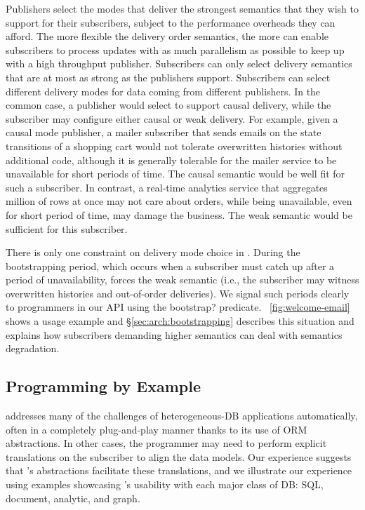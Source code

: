 Publishers select the modes that deliver the strongest semantics that
they wish to support for their subscribers, subject to the performance
overheads they can afford.  The more flexible the delivery order
semantics, the more \synapse can enable subscribers to process updates
with as much parallelism as possible to keep up with a high throughput
publisher.  Subscribers can only select delivery
semantics that are at most as strong as the publishers support.
Subscribers can select different delivery modes for data coming
from different publishers.  In the common case,
a publisher would select to support causal delivery, while the
subscriber may configure either causal or weak delivery. For example,
given a causal mode publisher, a mailer subscriber that sends emails
on the state transitions of a shopping cart would not tolerate
overwritten histories without additional code, although it is
generally tolerable for the mailer service to be unavailable for short
periods of time. The causal semantic would be well fit for
such a subscriber.  In contrast, a real-time analytics service that
aggregates million of rows at once may not care about orders, while
being unavailable, even for short period of time, may damage the
business.  The weak semantic would be sufficient for this subscriber.

There is only one constraint on delivery mode choice in
\synapse.  During the bootstrapping period, which occurs when a
subscriber must catch up after a period of unavailability, \synapse
forces the weak semantic (i.e., the subscriber may witness overwritten
histories and out-of-order deliveries).  We signal such periods
clearly to programmers in our API using the {\code bootstrap?}
predicate. \F~\ref{fig:welcome-email} shows a usage example and
\S\ref{sec:arch:bootstrapping} describes this situation and
explains how subscribers demanding higher semantics can deal with semantics
degradation.

\subsection{\synapse Programming by Example}
\label{sec:examples}

\synapse addresses many of the challenges of heterogeneous-DB applications automatically, often in a completely plug-and-play manner thanks to its use of ORM abstractions.
In other cases, the programmer may need to perform explicit translations on the subscriber to align the data models.
Our experience suggests that \synapse's abstractions facilitate these translations, and we illustrate our experience using examples showcasing \synapse's usability with each major class of DB: SQL, document, analytic, and graph.




